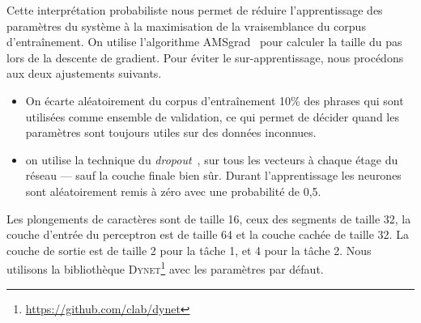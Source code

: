 Cette interprétation probabiliste nous permet de réduire l'apprentissage des paramètres du système à la maximisation de la vraisemblance du corpus d'entraînement.
On utilise l'algorithme AMSgrad~\cite{reddi2018on} pour  calculer la taille du pas lors de la descente de gradient.
Pour éviter le sur-apprentissage, nous  procédons aux deux ajustements suivants.
\begin{itemize}
\item On écarte aléatoirement du corpus d'entraînement 10\% des phrases qui sont utilisées comme ensemble de validation, ce qui permet de décider quand les paramètres sont toujours utiles sur des données inconnues.
\item on utilise la technique du \emph{dropout}~\cite{srivastava2014dropout}, sur tous les vecteurs à chaque étage du réseau --- sauf la couche finale bien sûr.
  Durant l'apprentissage les neurones sont aléatoirement remis à zéro avec une probabilité de 0,5.

\end{itemize}

Les plongements de caractères sont de taille 16, ceux des segments de taille 32, la couche d'entrée du perceptron est de taille 64 et la couche cachée de taille 32.
La couche de sortie est de taille 2 pour la tâche 1, et 4 pour la tâche 2.
Nous utilisons la bibliothèque \textsc{Dynet}\footnote{\url{https://github.com/clab/dynet}} avec les paramètres par défaut.

